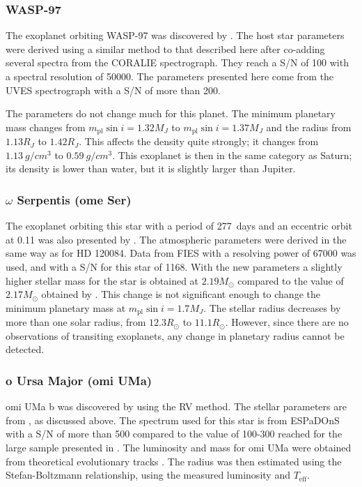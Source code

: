 \subsubsection{WASP-97}
\label{sub:WASP-97}

The exoplanet orbiting WASP-97 was discovered by \citet{Hellier2014}. The host star parameters were
derived using a similar method to that described here after co-adding several spectra from the
CORALIE spectrograph. They reach a S/N of 100 with a spectral resolution of \num{50000}. The
parameters presented here come from the UVES spectrograph with a S/N of more than 200.

The parameters do not change much for this planet. The minimum planetary mass changes from
$m_\mathrm{pl}\sin i=1.32M_J$ to $m_\mathrm{pl}\sin i=1.37M_J$ and the radius from $1.13R_J$ to
$1.42R_J$. This affects the density quite strongly; it changes from $\SI{1.13}{g/cm^3}$ to
$\SI{0.59}{g/cm^3}$. This exoplanet is then in the same category as Saturn; its density is lower
than water, but it is slightly larger than Jupiter.

\subsubsection{$\omega$ Serpentis (ome Ser)}
\label{sub:ome_Ser}

The exoplanet orbiting this star with a period of \SI{277}{days} and an eccentric orbit at 0.11 was
also presented by \citet{Sato2013}. The atmospheric parameters were derived in the same way as for
HD 120084. Data from FIES with a resolving power of \num{67000} was used, and with a S/N for this
star of 1168. With the new parameters a slightly higher stellar mass for the star is obtained at
$2.19M_\odot$ compared to the value of $2.17M_\odot$ obtained by \cite{Takeda2008}. This change is
not significant enough to change the minimum planetary mass at $m_\mathrm{pl}\sin i=1.7M_J$. The
stellar radius decreases by more than one solar radius, from $12.3R_\odot$ to $11.1R_\odot$.
However, since there are no observations of transiting exoplanets, any change in planetary radius
cannot be detected.



\subsubsection{o Ursa Major (omi UMa)}
\label{sub:omiUMa}

omi UMa b was discovered by \citet{Sato2012} using the RV method. The stellar parameters are from
\citet{Takeda2008}, as discussed above. The spectrum used for this star is from ESPaDOnS with a S/N
of more than 500 compared to the value of 100-300 reached for the large sample presented in
\citet{Takeda2008}. The luminosity and mass for omi UMa were obtained from theoretical evolutionary
tracks \citep[see][and references therein]{Sato2012}. The radius was then estimated using the
Stefan-Boltzmann relationship, using the measured luminosity and $T_\mathrm{eff}$.

